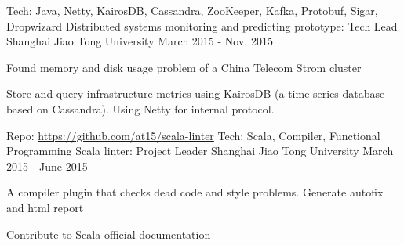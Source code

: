 \begin{cventries}
  \cventry
    {Tech: Java, Netty, KairosDB, Cassandra, ZooKeeper, Kafka, Protobuf, Sigar, Dropwizard}
    {Distributed systems monitoring and predicting prototype: Tech Lead} %
    {Shanghai Jiao Tong University} %
    {March 2015 - Nov. 2015} %
    {
      \begin{cvitems} %
        \item {Found memory and disk usage problem of a China Telecom Strom cluster}
        \item {Store and query infrastructure metrics using KairosDB (a time series database based on Cassandra). Using Netty for internal protocol.}
      \end{cvitems}
    }

    \cventry
      { Repo: \url{https://github.com/at15/scala-linter} Tech: Scala, Compiler, Functional Programming}
      {Scala linter: Project Leader} %
      {Shanghai Jiao Tong University} %
      {March 2015 - June 2015} %
      {
        \begin{cvitems} %
          \item {A compiler plugin that checks dead code and style problems. Generate autofix and html report}
          \item {Contribute to Scala official documentation}
        \end{cvitems}
      }


\end{cventries}
